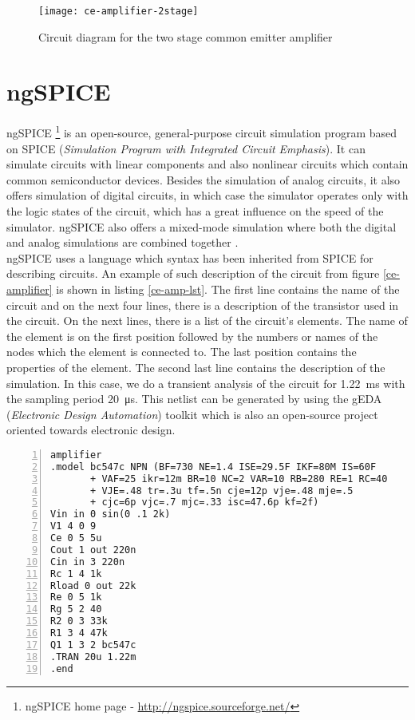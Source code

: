 \begin{figure}[H]
    \centering
    \texttt{[image: ce-amplifier-2stage]} \label{ce-amplifier-2stage}
    \caption{Circuit diagram for the two stage common emitter amplifier}
\end{figure}

\section{ngSPICE}
ngSPICE \footnote{ngSPICE home page - \url{http://ngspice.sourceforge.net/}} is an open-source, general-purpose circuit simulation program based on SPICE (\textit{Simulation Program with Integrated Circuit Emphasis}). It can simulate circuits with linear components and also nonlinear circuits which contain common semiconductor devices. Besides the simulation of analog circuits, it also offers simulation of digital circuits, in which case the simulator operates only with the logic states of the circuit, which has a great influence on the speed of the simulator. ngSPICE also offers a mixed-mode simulation where both the digital and analog simulations are combined together \cite{ngSPICE-manual}.\\
ngSPICE uses a language which syntax has been inherited from SPICE for describing circuits. An example of such description of the circuit from figure \ref{ce-amplifier} is shown in listing \ref{ce-amp-lst}. The first line contains the name of the circuit and on the next four lines, there is a description of the transistor used in the circuit. On the next lines, there is a list of the circuit's elements. The name of the element is on the first position followed by the numbers or names of the nodes which the element is connected to. The last position contains the properties of the element. The second last line contains the description of the simulation. In this case, we do a transient analysis of the circuit for \SI{1.22}{\milli\second} with the sampling period \SI{20}{\micro\second}. This netlist can be generated by using the gEDA (\textit{Electronic Design Automation}) toolkit which is also an open-source project oriented towards electronic design.

\begin{lstlisting}[caption={description of the common emitter amplifier using the SPICE syntax},
                   label={ce-amp-lst},
                   captionpos=b,
                   numbers=left]
 amplifier
.model bc547c NPN (BF=730 NE=1.4 ISE=29.5F IKF=80M IS=60F
       + VAF=25 ikr=12m BR=10 NC=2 VAR=10 RB=280 RE=1 RC=40
       + VJE=.48 tr=.3u tf=.5n cje=12p vje=.48 mje=.5
       + cjc=6p vjc=.7 mjc=.33 isc=47.6p kf=2f)
Vin in 0 sin(0 .1 2k)
V1 4 0 9
Ce 0 5 5u
Cout 1 out 220n
Cin in 3 220n
Rc 1 4 1k
Rload 0 out 22k
Re 0 5 1k
Rg 5 2 40
R2 0 3 33k
R1 3 4 47k
Q1 1 3 2 bc547c
.TRAN 20u 1.22m
.end
\end{lstlisting}

